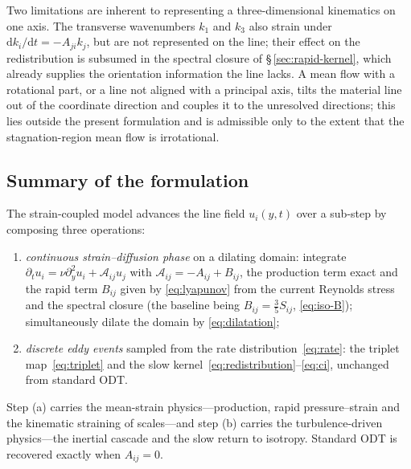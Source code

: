 \documentclass[lineno]{JFM-FLM_Au}
\begin{document}
Two limitations are inherent to representing a three-dimensional kinematics
on one axis. The transverse wavenumbers $k_1$ and $k_3$ also strain under
$\mathrm{d}k_i/\mathrm{d}t=-A_{ji}k_j$, but are not represented on the line;
their effect on the redistribution is subsumed in the spectral closure of
\S\,\ref{sec:rapid-kernel}, which already supplies the orientation
information the line lacks. A mean flow with a rotational part, or a line
not aligned with a principal axis, tilts the material line out of the
coordinate direction and couples it to the unresolved directions; this lies
outside the present formulation and is admissible only to the extent that
the stagnation-region mean flow is irrotational.

\subsection{Summary of the formulation}\label{sec:summary}

The strain-coupled model advances the line field $u_i(y,t)$ over a
sub-step by composing three operations:
\begin{enumerate}
\item[(a)] \emph{continuous strain--diffusion phase} on a dilating domain:
  integrate $\partial_t u_i=\nu\partial_y^2 u_i+\mathcal{A}_{ij}u_j$ with
  $\mathcal{A}_{ij}=-A_{ij}+B_{ij}$, the production term exact and the
  rapid term $B_{ij}$ given by \eqref{eq:lyapunov} from the current
  Reynolds stress and the spectral closure (the baseline being
  $B_{ij}=\tfrac35 S_{ij}$, \eqref{eq:iso-B}); simultaneously dilate the
  domain by \eqref{eq:dilatation};
\item[(b)] \emph{discrete eddy events} sampled from the rate
  distribution~\eqref{eq:rate}: the triplet map~\eqref{eq:triplet} and the
  slow kernel~\eqref{eq:redistribution}--\eqref{eq:ci}, unchanged from
  standard ODT.
\end{enumerate}
Step (a) carries the mean-strain physics---production, rapid
pressure--strain and the kinematic straining of scales---and step (b)
carries the turbulence-driven physics---the inertial cascade and the slow
return to isotropy. Standard ODT is recovered exactly when $A_{ij}=0$.
\end{document}
